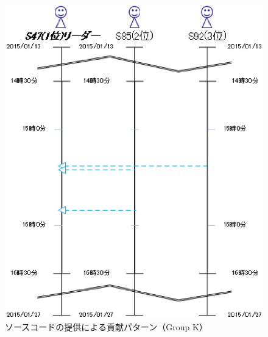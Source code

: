 \begin{figure}[tb]
	\begin{center}
		\includegraphics[scale=0.4]{img/flowK.eps}
		\caption{ソースコードの提供による貢献パターン（Group K）}
		\label{fig:flowK}
	\end{center}
\end{figure}

